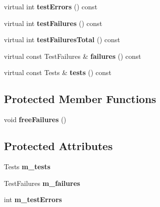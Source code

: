 \begin{DoxyCompactItemize}
\item 
virtual int {\bfseries test\+Errors} () const \hypertarget{class_test_result_collector_a0dc4aa03e6b22907cd44cf30a9ea0af3}{}\label{class_test_result_collector_a0dc4aa03e6b22907cd44cf30a9ea0af3}

\item 
virtual int {\bfseries test\+Failures} () const \hypertarget{class_test_result_collector_a583a62791337a71725a719f57dc654e2}{}\label{class_test_result_collector_a583a62791337a71725a719f57dc654e2}

\item 
virtual int {\bfseries test\+Failures\+Total} () const \hypertarget{class_test_result_collector_a73417ff24fff145f3575c3860d8e9340}{}\label{class_test_result_collector_a73417ff24fff145f3575c3860d8e9340}

\item 
virtual const Test\+Failures \& {\bfseries failures} () const \hypertarget{class_test_result_collector_a9c04c7276b1b19879cc3d51e9e9f33ff}{}\label{class_test_result_collector_a9c04c7276b1b19879cc3d51e9e9f33ff}

\item 
virtual const Tests \& {\bfseries tests} () const \hypertarget{class_test_result_collector_a25890515b8eba397855a64582d3e7a9b}{}\label{class_test_result_collector_a25890515b8eba397855a64582d3e7a9b}

\end{DoxyCompactItemize}
\subsection*{Protected Member Functions}
\begin{DoxyCompactItemize}
\item 
void {\bfseries free\+Failures} ()\hypertarget{class_test_result_collector_ae3ca204ba9e242a368843e91acf94766}{}\label{class_test_result_collector_ae3ca204ba9e242a368843e91acf94766}

\end{DoxyCompactItemize}
\subsection*{Protected Attributes}
\begin{DoxyCompactItemize}
\item 
Tests {\bfseries m\+\_\+tests}\hypertarget{class_test_result_collector_a63950609cce95633b56850da67d4bfe0}{}\label{class_test_result_collector_a63950609cce95633b56850da67d4bfe0}

\item 
Test\+Failures {\bfseries m\+\_\+failures}\hypertarget{class_test_result_collector_ae2958ff17d1fd73092bf8ec4fc5db08f}{}\label{class_test_result_collector_ae2958ff17d1fd73092bf8ec4fc5db08f}

\item 
int {\bfseries m\+\_\+test\+Errors}\hypertarget{class_test_result_collector_a42fdacb6076281e8abb6eba08063fb4e}{}\label{class_test_result_collector_a42fdacb6076281e8abb6eba08063fb4e}

\end{DoxyCompactItemize}
